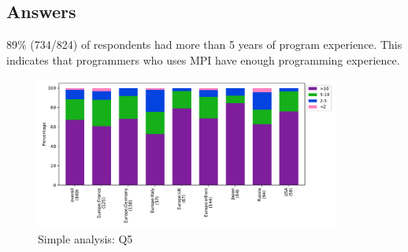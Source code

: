 
\subsection{Answers}


89\% (734/824) of respondents had more than 5 years of 
program experience. This indicates that programmers 
who uses MPI have enough programming experience.

\begin{figure}[htb]
\begin{center}
\includegraphics[width=10cm]{../pdfs/Q5.pdf}
\caption{Simple analysis: Q5}
\label{fig:Q5}
\end{center}
\end{figure}
